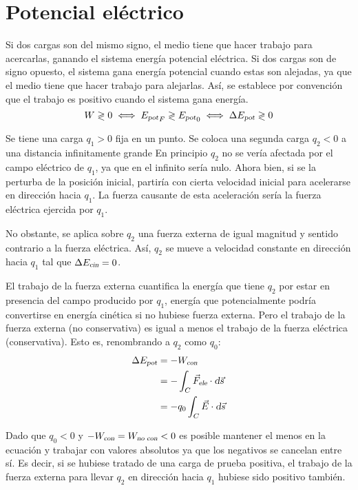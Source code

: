 \section{Potencial eléctrico}

Si dos cargas son del mismo signo, el medio tiene que hacer trabajo para acercarlas, ganando el sistema energía potencial eléctrica.
Si dos cargas son de signo opuesto, el sistema gana energía potencial cuando estas son alejadas, ya que el medio tiene que hacer trabajo para alejarlas.
Así, se establece por convención que el trabajo es positivo cuando el sistema gana energía.
\begin{equation*}
    W \gtrless 0 \iff {{{E}_\textsl{{pot}}}}_F \gtrless {{{E}_\textsl{{pot}}}}_0 \iff \Delta {{E}_\textsl{{pot}}} \gtrless 0
\end{equation*}

Se tiene una carga $q_1 > 0$ fija en un punto.
Se coloca una segunda carga $q_2 < 0$ a una distancia infinitamente grande
En principio $q_2$ no se vería afectada por el campo eléctrico de $q_1$, ya que en el infinito sería nulo.
Ahora bien, si se la perturba de la posición inicial, partiría con cierta velocidad inicial para acelerarse en dirección hacia $q_1$.
La fuerza causante de esta aceleración sería la fuerza eléctrica ejercida por $q_1$.

No obstante, se aplica sobre $q_2$ una fuerza externa de igual magnitud y sentido contrario a la fuerza eléctrica.
Así, $q_2$ se mueve a velocidad constante en dirección hacia $q_1$ tal que $\Delta {{E}_\textsl{{cin}}} = 0$.

El trabajo de la fuerza externa cuantifica la energía que tiene $q_2$ por estar en presencia del campo producido por $q_1$, energía que potencialmente podría convertirse en energía cinética si no hubiese fuerza externa.
Pero el trabajo de la fuerza externa (no conservativa) es igual a menos el trabajo de la fuerza eléctrica (conservativa).
Esto es, renombrando a $q_2$ como $q_0$:
\begin{align*}
    \Delta {{E}_\textsl{{pot}}} &= - {{W}_\textsl{{con}}}
    \\
    &= - \int_C {{\Vec{F}}_\textsl{{ele}}} \cdot \textsl{d} \Vec{s}
    \\
    &= - q_0 \int_C \Vec{E} \cdot \textsl{d} \Vec{s}
\end{align*}

Dado que $q_0 < 0$ y $-{{W}_\textsl{{con}}} = {{W}_\textsl{{no con}}} < 0$ es posible mantener el menos en la ecuación y trabajar con valores absolutos ya que los negativos se cancelan entre sí.
Es decir, si se hubiese tratado de una carga de prueba positiva, el trabajo de la fuerza externa para llevar $q_2$ en dirección hacia $q_1$ hubiese sido positivo también.

